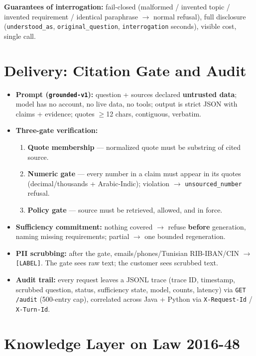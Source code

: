 \documentclass[a4paper,12pt]{report}
\begin{document}
\noindent\textbf{Guarantees of interrogation:} fail-closed (malformed / invented topic / invented requirement / identical paraphrase $\rightarrow$ normal refusal), full disclosure (\texttt{understood\_as}, \texttt{original\_question}, \texttt{interrogation} seconds), visible cost, single call.

\section{Delivery: Citation Gate and Audit}

\begin{itemize}[leftmargin=1.2cm, itemsep=2pt]
\item \textbf{Prompt (\texttt{grounded-v1}):} question + sources declared \textbf{untrusted data}; model has no account, no live data, no tools; output is strict JSON with claims + evidence; quotes $\geq$12 chars, contiguous, verbatim.
\item \textbf{Three-gate verification:}
  \begin{enumerate}[label=\roman*.]
    \item \textbf{Quote membership} --- normalized quote must be substring of cited source.
    \item \textbf{Numeric gate} --- every number in a claim must appear in its quotes (decimal/thousands + Arabic-Indic); violation $\rightarrow$ \texttt{unsourced\_number} refusal.
    \item \textbf{Policy gate} --- source must be retrieved, allowed, and in force.
  \end{enumerate}
\item \textbf{Sufficiency commitment:} nothing covered $\rightarrow$ refuse \textbf{before} generation, naming missing requirements; partial $\rightarrow$ one bounded regeneration.
\item \textbf{PII scrubbing:} after the gate, emails/phones/Tunisian RIB-IBAN/CIN $\rightarrow$ \texttt{[LABEL]}. The gate sees raw text; the customer sees scrubbed text.
\item \textbf{Audit trail:} every request leaves a JSONL trace (trace ID, timestamp, scrubbed question, status, sufficiency state, model, counts, latency) via \texttt{GET /audit} (500-entry cap), correlated across Java + Python via \texttt{X-Request-Id} / \texttt{X-Turn-Id}.
\end{itemize}

\section{Knowledge Layer on Law 2016-48}
\end{document}
